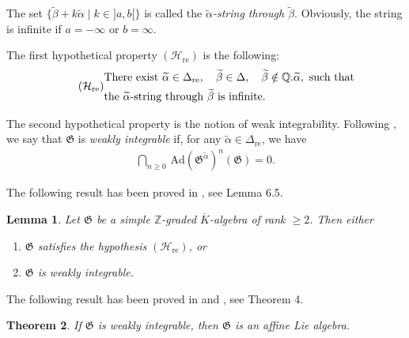 \documentclass[11pt, letterpaper, reqno]{amsart}
\newtheorem{theorem}{Theorem}
\newtheorem{lemma}[theorem]{Lemma}
\theoremstyle{definition}
\newcommand{\Q}{{\mathbb Q}}
\newcommand{\Z}{{\mathbb Z}}
\newcommand{\G}{\mathfrak G}
\newcommand{\fG}{\mathfrak{G}}
\newcommand{\Ad}{\mathrm{Ad}}
\begin{document}
\medbreak
\noindent The set 
$\{\widetilde\beta+k\widetilde\alpha\mid k\in]a,b[\}$ is called the 
\emph{$\widetilde\alpha$-string through $\widetilde\beta$}. Obviously, the string is infinite if
$a=-\infty$ or $b=\infty$.

\medbreak
The first hypothetical property  
$(\mathcal{H}_{\operatorname{re}})$ is the following: 
\begin{align}\tag{$\mathcal{H}_{\operatorname{re}}$} 
\begin{aligned}
&\text{There exist }\widetilde{\alpha}\in\Delta_{\operatorname{re}}, \quad
\widetilde{\beta}\in \Delta, \quad 
\widetilde{\beta} \notin \Q.\widetilde{\alpha},  \text{ such that}
\\ &\text{the $\widetilde\alpha$-string through $\widetilde\beta$ is infinite.}
\end{aligned}
\end{align}
 

\medbreak
The second hypothetical property is the notion of weak integrability.
Following \cite{Mathieu-inv2}, we say that $\mathcal{\G}$ is {\it weakly integrable} if,
for any $\widetilde{\alpha}\in\Delta_{\operatorname{re}}$, we have 
\begin{align*}
\bigcap_{n\geq 0}\,\Ad(\mathcal{\G}^{\widetilde\alpha})^n(\mathcal{\G})=0.
\end{align*}

The following result has been proved in
\cite{AndMath}, see Lemma 6.5.


\begin{lemma}\label{dicho} Let $\mathcal{\fG}$ be a simple $\Z$-graded $\overline{K}$-algebra of
rank $\geq 2$. Then either

\begin{enumerate}[leftmargin=*,label=\rm{(\alph*)}]
\item   $\mathcal{\fG}$ satisfies the hypothesis 
$(\mathcal{H}_{\operatorname{re}})$, or

\item  $\mathcal{\fG}$ is weakly integrable.
\end{enumerate}
\end{lemma}

The following result has been  proved in \cite{Mathieu-inv1}
and  \cite{Mathieu-inv2}, see Theorem 4.

\begin{theorem}\label{integrability}  If $\mathcal{\fG}$ is weakly integrable, then $\fG$ is an affine Lie algebra.
\end{theorem}
\end{document}
